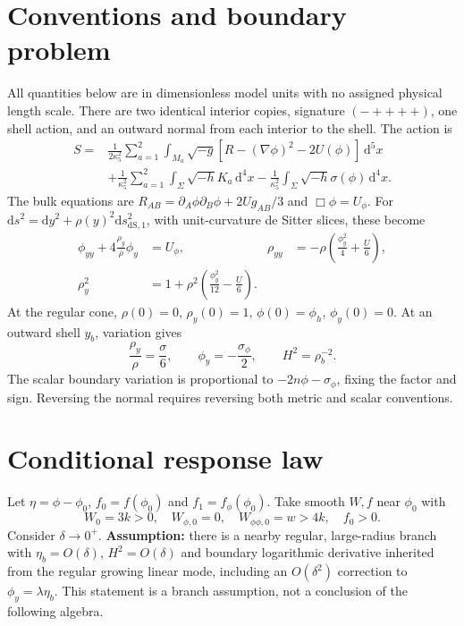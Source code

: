 \documentclass[11pt]{article}
\newcommand{\dd}{\mathrm{d}}
\begin{document}
\section{Conventions and boundary problem}
All quantities below are in dimensionless model units with no assigned physical length scale. There are two identical interior copies, signature $(-++++)$, one shell action, and an outward normal from each interior to the shell. The action is
\begin{align}
 S={}&\frac{1}{2\kappa_5^2}\sum_{a=1}^2\int_{M_a}\sqrt{-g}
 [R-(\nabla\phi)^2-2U(\phi)]\,\dd^5x \\
 &+\frac{1}{\kappa_5^2}\sum_{a=1}^2\int_\Sigma\sqrt{-h}K_a\,\dd^4x
 -\frac{1}{\kappa_5^2}\int_\Sigma\sqrt{-h}\sigma(\phi)\,\dd^4x.\nonumber
\end{align}
The bulk equations are $R_{AB}=\partial_A\phi\partial_B\phi+2Ug_{AB}/3$ and $\Box\phi=U_\phi$. For $\dd s^2=\dd y^2+\rho(y)^2\dd s^2_{\mathrm{dS},1}$, with unit-curvature de Sitter slices, these become
\begin{align}
 \phi_{yy}+4\frac{\rho_y}{\rho}\phi_y&=U_\phi,&
 \rho_{yy}&=-\rho\left(\frac{\phi_y^2}{4}+\frac{U}{6}\right),\label{eq:radial}\\
 \rho_y^2&=1+\rho^2\left(\frac{\phi_y^2}{12}-\frac{U}{6}\right).\label{eq:constraint}
\end{align}
At the regular cone, $\rho(0)=0$, $\rho_y(0)=1$, $\phi(0)=\phi_h$, $\phi_y(0)=0$. At an outward shell $y_b$, variation gives
\begin{equation}
 \frac{\rho_y}{\rho}=\frac{\sigma}{6},\qquad
 \phi_y=-\frac{\sigma_\phi}{2},\qquad H^2=\rho_b^{-2}.\label{eq:junction}
\end{equation}
The scalar boundary variation is proportional to $-2n\phi-\sigma_\phi$, fixing the factor and sign. Reversing the normal requires reversing both metric and scalar conventions.

\section{Conditional response law}
Let $\eta=\phi-\phi_0$, $f_0=f(\phi_0)$ and $f_1=f_\phi(\phi_0)$. Take smooth $W,f$ near $\phi_0$ with
\begin{equation}
 W_0=3k>0,\quad W_{\phi,0}=0,\quad W_{\phi\phi,0}=w>4k,\quad f_0>0.
\end{equation}
Consider $\delta\to0^+$. \textbf{Assumption:} there is a nearby regular, large-radius branch with $\eta_b=O(\delta)$, $H^2=O(\delta)$ and boundary logarithmic derivative inherited from the regular growing linear mode, including an $O(\delta^2)$ correction to $\phi_y=\lambda\eta_b$. This statement is a branch assumption, not a conclusion of the following algebra.
\end{document}
